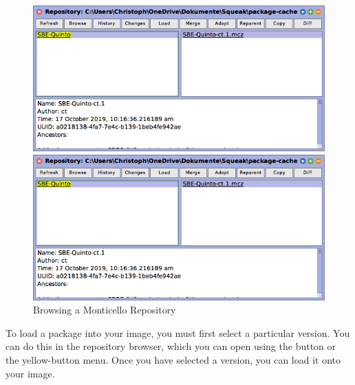 \documentclass[a4paper,10pt,twoside]{book}
\begin{document}
\begin{figure}[hbt]
\ifluluelse
	{\centerline {\includegraphics[width=\textwidth]{BrowseRepository}}}
	{\centerline {\includegraphics[scale=0.7]{BrowseRepository}}}
\caption{Browsing a Monticello Repository
\label{fig:monticello3}}
\end{figure}


To load a package into your image, you must first select a particular version.  You can do this in the repository browser, which you can open using the  button or the yellow-button menu.  Once you have selected a version, you can load it onto your image.

\end{document}
